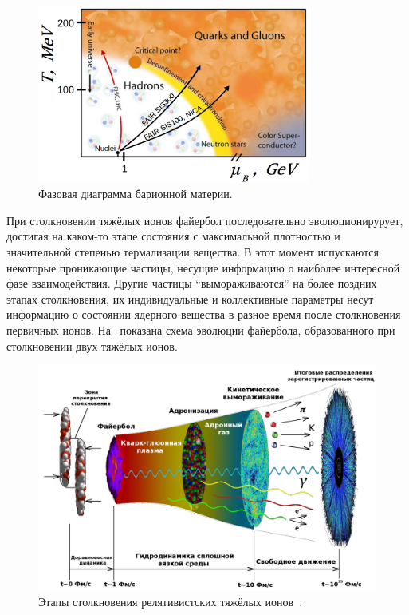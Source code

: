\begin{figure}[H]
\centering
\includegraphics[width=0.8\textwidth]{pictures/QGP_phase_diag_3.png}
\caption{Фазовая диаграмма барионной материи.}
\label{fig:PhaseDiagram}
\end{figure}


При столкновении тяжёлых ионов файербол последовательно эволюционирурует, достигая на каком-то этапе состояния с максимальной плотностью и значительной степенью термализации вещества. В этот момент испускаются некоторые проникающие частицы, несущие информацию о наиболее интересной фазе взаимодействия. Другие частицы ``вымораживаются'' на более поздних этапах столкновения, их индивидуальные и коллективные параметры несут информацию о состоянии ядерного вещества в разное время после столкновения первичных ионов. На~ показана схема эволюции файербола, образованного при столкновении двух тяжёлых ионов.

\begin{figure}[H]
\centering
\includegraphics[width=1.0\textwidth]{pictures/little_bang_rus2.png}
\caption{Этапы столкновения релятивистских тяжёлых ионов~\cite{Chen}.}
\label{fig:LittleBang}
\end{figure}

